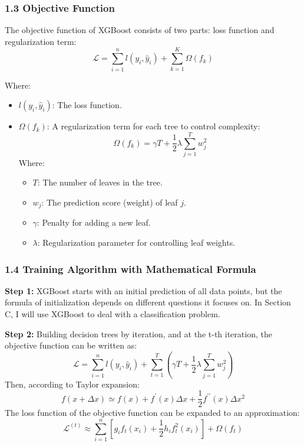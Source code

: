 \documentclass[
]{article}
\begin{document}
\subsubsection{1.3 Objective Function}\label{objective-function}

The objective function of XGBoost consists of two parts: loss function
and regularization term: \[
\mathcal{L} = \sum_{i=1}^n l(y_i, \hat{y}_i) + \sum_{k=1}^K \Omega(f_k)
\]

Where:

\begin{itemize}
\item
  \(l(y_i, \hat{y}_i)\): The loss function.
\item
  \(\Omega(f_k)\): A regularization term for each tree to control
  complexity: \[
  \Omega(f_k) = \gamma T + \frac{1}{2} \lambda \sum_{j=1}^T w_j^2
  \] Where:

  \begin{itemize}
  \item
    \(T\): The number of leaves in the tree.
  \item
    \(w_j\): The prediction score (weight) of leaf \(j\).
  \item
    \(\gamma\): Penalty for adding a new leaf.
  \item
    \(\lambda\): Regularization parameter for controlling leaf weights.
  \end{itemize}
\end{itemize}

\subsubsection{1.4 Training Algorithm with Mathematical
Formula}\label{training-algorithm-with-mathematical-formula}

\textbf{Step 1:} XGBoost starts with an initial prediction of all data
points, but the formula of initialization depends on different questions
it focuses on. In Section C, I will use XGBoost to deal with a
classification problem.

\textbf{Step 2:} Building decision trees by iteration, and at the t-th
iteration, the objective function can be written as: \[
\mathcal{L} = \sum_{i=1}^n l(y_i, \hat{y}_i) + \sum_{t=1}^T \left( \gamma T + \frac{1}{2} \lambda \sum_{j=1}^T w_j^2 \right)
\] Then, according to Taylor expansion: \[
f(x+\Delta x) \simeq f(x)+f^{\prime}(x) \Delta x+\frac{1}{2} f^{\prime \prime}(x) \Delta x^2
\] The loss function of the objective function can be expanded to an
approximation: \[
\mathcal{L}^{(t)} \approx \sum_{i=1}^n \left[ g_i f_t(x_i) + \frac{1}{2} h_i f_t^2(x_i) \right] + \Omega(f_t)
\]
\end{document}
